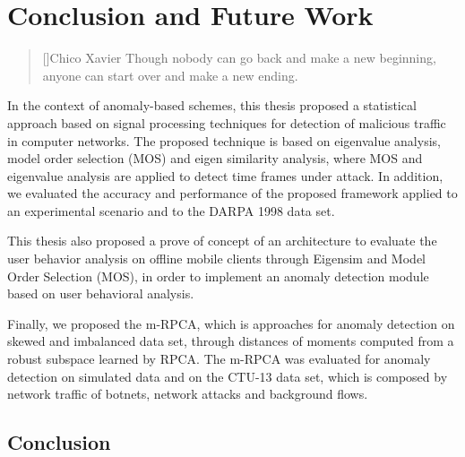 \chapter{Conclusion and Future Work}
\label{ch:5_conclusionfuturework}

\begin{quotation}[]{Chico Xavier}
Though nobody can go back and make a new beginning, anyone can start over and make a new ending.
\end{quotation}


In the context of anomaly-based schemes, this thesis proposed a statistical approach based on signal processing techniques for detection of malicious traffic in computer networks. The proposed technique is based on eigenvalue analysis, model order selection (MOS) and eigen similarity analysis, where MOS and eigenvalue analysis are applied to detect time frames under attack. In addition, we evaluated the accuracy and performance of the proposed framework applied to an experimental scenario and to the DARPA 1998 data set. 

This thesis also proposed a prove of concept of an architecture to evaluate the user behavior analysis on offline mobile clients through Eigensim and Model Order Selection (MOS), in order to implement an anomaly detection module based on user behavioral analysis.

Finally, we proposed the m-RPCA, which is approaches for anomaly detection on skewed and imbalanced data set, through distances of moments computed from a robust subspace learned by RPCA. The m-RPCA was evaluated for anomaly detection on simulated data and on the CTU-13 data set, which is composed by network traffic of botnets, network attacks and background flows.

\section{Conclusion}
\label{sc:conc_conclusion}

